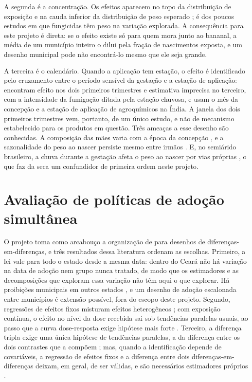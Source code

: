 A segunda é a concentração. Os efeitos aparecem no topo da distribuição de
exposição \cite{larsen2017agricultural} e na cauda inferior da distribuição de
peso esperado \cite{reynier2025glyphosate};  é dos poucos estudos em que fungicidas têm
peso na variação explorada. A consequência para este
projeto é direta: se o efeito existe só para quem mora junto ao bananal, a
média de um município inteiro o dilui pela fração de nascimentos exposta, e um
desenho municipal pode não encontrá-lo mesmo que ele seja grande.

A terceira é o calendário. Quando a aplicação tem estação, o efeito é
identificado pelo cruzamento entre o período sensível da gestação e a estação
de aplicação:  encontram efeito nos dois
primeiros trimestres e estimativa imprecisa no terceiro, com a intensidade da fumigação
ditada pela estação chuvosa, e  usam o mês da
concepção e a estação de aplicação de agroquímicos na Índia. A janela dos dois
primeiros trimestres vem, portanto, de um único estudo, e não de mecanismo
estabelecido para os produtos em questão. Três ameaças a esse desenho são conhecidas. A composição das mães
varia com a época da concepção \cite{buckles2013season}, e a sazonalidade do
peso ao nascer persiste mesmo entre irmãos \cite{currie2013within}. E, no
semiárido brasileiro, a chuva durante a gestação afeta o peso ao nascer por
vias próprias \cite{rocha2015water}, o que faz da seca um confundidor de
primeira ordem neste projeto.

\section{Avaliação de políticas de adoção simultânea}

O projeto toma como arcabouço a organização de 
para desenhos de diferenças-em-diferenças, e três resultados dessa literatura
ordenam as escolhas. Primeiro, a lei vale para todo o estado desde a mesma
data: dentro do Ceará não há variação na data de adoção nem grupo nunca
tratado, de modo que os estimadores e as decomposições que exploram essa
variação \cite{callaway2021multiple,goodmanbacon2021} não têm aqui o que
explorar. Há proibições municipais em outros estados \cite{lavor2019antes}, e
um desenho de adoção escalonada entre municípios é extensão possível, fora do
escopo deste projeto. Segundo, regressões de efeitos fixos misturam efeitos heterogêneos
\cite{dechaisemartin2020}; com exposição contínua, o efeito no nível da dose
recebida sai sob tendências paralelas usuais, ao passo que a curva
dose-resposta exige hipótese mais forte \cite{callaway2024continuous}.
Terceiro, a diferença tripla exige uma única hipótese de tendências paralelas,
a da diferença entre os dois contrastes que a compõem \cite{olden2022triple};
mas, quando a identificação depende de covariáveis, a regressão de efeitos
fixos e a diferença entre dois diferenças-em-diferenças deixam, em geral, de
ser válidas, e são necessários estimadores próprios
\cite{ortiz2025triple}.
